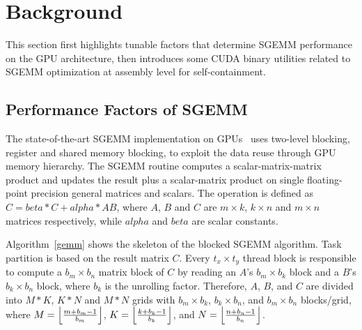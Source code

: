 \section{Background}
\label{sec:background}

This section first highlights tunable factors that determine SGEMM performance on the GPU architecture, then introduces some CUDA binary utilities related to SGEMM optimization at assembly level for self-containment. 


\subsection{Performance Factors of SGEMM}
\label{sec:sgemm}
The state-of-the-art SGEMM implementation on GPUs~\cite{magma,nervana_sgemm_wiki,lai,tan} uses two-level blocking,
register and shared memory blocking, to exploit the data reuse through GPU memory hierarchy.
The SGEMM routine computes a scalar-matrix-matrix product and updates the result plus
a scalar-matrix product on single floating-point precision general matrices and scalars. 
The operation is defined as $C
= beta*C + alpha*AB$, where $A$, $B$ and $C$ are $m\times k$, $k\times n$ and
$m\times n$ matrices respectively, while $alpha$ and $beta$ are scalar constants.

Algorithm~\ref{gemm} shows the skeleton of the blocked SGEMM algorithm. 
Task partition is based on the result matrix $C$. 
Every $t_x \times t_y$ thread block is responsible to compute a $b_m \times b_n$ matrix block of $C$ by reading an $A$'s $b_m \times b_k$ block and a $B$'s $b_k \times b_n$ block, where $b_k$ is the unrolling factor.
Therefore, $A$, $B$, and $C$ are divided into $M*K$, $K*N$ and 
$M*N$ grids with $b_m \times b_k$, $b_k \times b_n$, and $b_m \times b_n$ blocks/grid, where $M=\Bigl\lfloor \frac{m+b_m-1}{b_m} \Bigr\rfloor$, 
$K=\Bigl\lfloor \frac{k+b_k-1}{b_k} \Bigr\rfloor$, and $N=\Bigl\lfloor \frac{n+b_n-1}{b_n} \Bigr\rfloor$.

